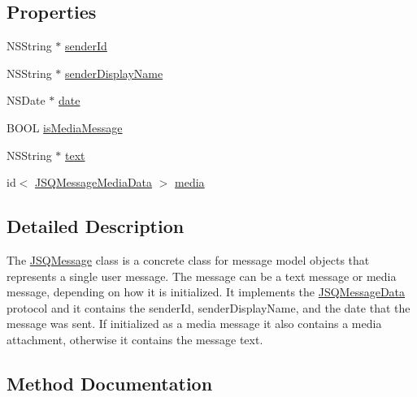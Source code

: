 \subsection*{Properties}
\begin{DoxyCompactItemize}
\item 
N\+S\+String $\ast$ \hyperlink{interface_j_s_q_message_a2319678d102c89d8d936de6123e8b2dd}{sender\+Id}
\item 
N\+S\+String $\ast$ \hyperlink{interface_j_s_q_message_ad5221a5e8e93cda57875efd26154cbcc}{sender\+Display\+Name}
\item 
N\+S\+Date $\ast$ \hyperlink{interface_j_s_q_message_a3c9d613ecf1f212e8e76f4582b8ef56b}{date}
\item 
B\+O\+O\+L \hyperlink{interface_j_s_q_message_a357e8c434071c3d189f1d82b6bc10dfa}{is\+Media\+Message}
\item 
N\+S\+String $\ast$ \hyperlink{interface_j_s_q_message_ab3d3b9aacf746c2c98bb4abe0944aa6d}{text}
\item 
id$<$ \hyperlink{protocol_j_s_q_message_media_data-p}{J\+S\+Q\+Message\+Media\+Data} $>$ \hyperlink{interface_j_s_q_message_af6afdd2a8e17b8513821b7d1d62e0181}{media}
\end{DoxyCompactItemize}


\subsection{Detailed Description}
The {\ttfamily \hyperlink{interface_j_s_q_message}{J\+S\+Q\+Message}} class is a concrete class for message model objects that represents a single user message. The message can be a text message or media message, depending on how it is initialized. It implements the {\ttfamily \hyperlink{protocol_j_s_q_message_data-p}{J\+S\+Q\+Message\+Data}} protocol and it contains the sender\+Id, sender\+Display\+Name, and the date that the message was sent. If initialized as a media message it also contains a media attachment, otherwise it contains the message text. 

\subsection{Method Documentation}
\hypertarget{interface_j_s_q_message_a1356c8de521c5e8ef056debd09f2737d}{}
